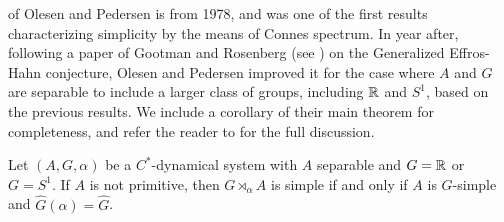  of Olesen and Pedersen is from 1978, and was one of the first results characterizing simplicity by the means of Connes spectrum. In year after, following a paper of Gootman and Rosenberg (see \cite{gootman1979structure}) on the Generalized Effros-Hahn conjecture, Olesen and Pedersen improved it for the case where $A$ and $G$ are separable to include a larger class of groups, including $\mathbb{R}$ and $S^1$, based on the previous results. We include a corollary of their main theorem for completeness, and refer the reader to \cite{olesenpedersen2} for the full discussion.
\begin{corollary}
	Let $(A,G,\alpha)$ be a $C^*$-dynamical system with $A$ separable and $G = \mathbb{R}$ or $G=S^1$. If $A$ is not primitive, then $G \rtimes_\alpha A$ is simple if and only if $A$ is $G$-simple and $\hat G(\alpha) = \hat G$.
\end{corollary}

